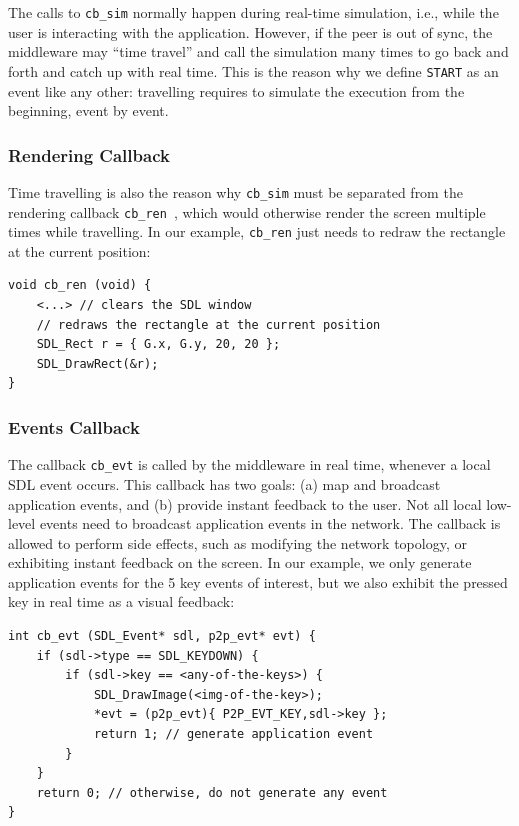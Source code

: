 \documentclass[fleqn,10pt]{SelfArx}
\newcommand{\code}[1]  {\texttt{\footnotesize{#1}}}
\begin{document}
The calls to \code{cb\_sim} normally happen during real-time simulation, i.e.,
while the user is interacting with the application.
However, if the peer is out of sync, the middleware may ``time travel'' and
call the simulation many times to go back and forth and catch up with real
time.
This is the reason why we define \code{START} as an event like any other:
travelling requires to simulate the execution from the beginning, event by
event.

\subsubsection{Rendering Callback}
\label{sec.tml.api.cb_ren}

Time travelling is also the reason why \code{cb\_sim} must be separated from
the rendering callback \code{cb\_ren}~\cite{tml.js}, which would otherwise
render the screen multiple times while travelling.
In our example, \code{cb\_ren} just needs to redraw the rectangle at the
current position:

{\footnotesize
\begin{verbatim}
void cb_ren (void) {
    <...> // clears the SDL window
    // redraws the rectangle at the current position
    SDL_Rect r = { G.x, G.y, 20, 20 };
    SDL_DrawRect(&r);
}
\end{verbatim}
}

\subsubsection{Events Callback}
\label{sec.tml.api.cb_evt}

The callback \code{cb\_evt} is called by the middleware in real time, whenever
a local SDL event occurs.
This callback has two goals:
    (a) map and broadcast application events, and
    (b) provide instant feedback to the user.
Not all local low-level events need to broadcast application events in the
network.
The callback is allowed to perform side effects, such as modifying the network
topology, or exhibiting instant feedback on the screen.
In our example, we only generate application events for the 5 key events of
interest, but we also exhibit the pressed key in real time as a visual
feedback:

{\footnotesize
\begin{verbatim}
int cb_evt (SDL_Event* sdl, p2p_evt* evt) {
    if (sdl->type == SDL_KEYDOWN) {
        if (sdl->key == <any-of-the-keys>) {
            SDL_DrawImage(<img-of-the-key>);
            *evt = (p2p_evt){ P2P_EVT_KEY,sdl->key };
            return 1; // generate application event
        }
    }
    return 0; // otherwise, do not generate any event
}
\end{verbatim}
}
\end{document}
